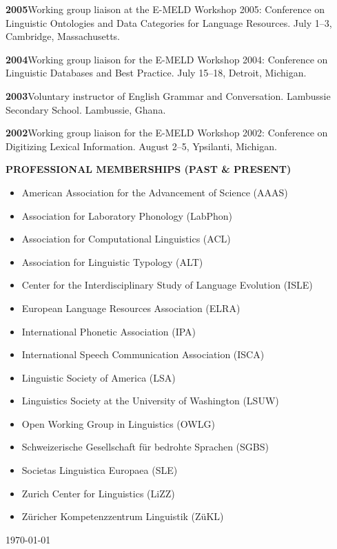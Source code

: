 \documentclass[11pt]{article}
\newcommand{\hangpara}{
 \setlength{\parindent}{0in} %
 \hangindent=0.42in %
}
\begin{document}
\vskip 6pt
\hangpara
{\bf 2005}\hspace{1ex}Working group liaison at the E-MELD Workshop 2005: Conference on Linguistic Ontologies and Data Categories for Language Resources. July 1--3, Cambridge, Massachusetts.

\vskip 6pt
\hangpara
{\bf 2004}\hspace{1ex}Working group liaison for the E-MELD Workshop 2004: Conference on Linguistic Databases and Best Practice. July 15--18, Detroit, Michigan.

\vskip 6pt
\hangpara
{\bf 2003}\hspace{1ex}Voluntary instructor of English Grammar and Conversation. Lambussie Secondary School. Lambussie, Ghana.

\vskip 6pt
\hangpara
{\bf 2002}\hspace{1ex}Working group liaison for the E-MELD Workshop 2002: Conference on Digitizing Lexical Information. August 2--5, Ypsilanti, Michigan.


\clearpage
\vskip 20pt
\begin{flushleft}
{\bf PROFESSIONAL MEMBERSHIPS (PAST \& PRESENT)}
\end{flushleft}
\begin{itemize}
\item American Association for the Advancement of Science (AAAS)
\item Association for Laboratory Phonology (LabPhon)
\item Association for Computational Linguistics (ACL)
\item Association for Linguistic Typology (ALT)
\item Center for the Interdisciplinary Study of Language Evolution (ISLE)
\item European Language Resources Association (ELRA)
\item International Phonetic Association (IPA)
\item International Speech Communication Association (ISCA)
\item Linguistic Society of America (LSA)
\item Linguistics Society at the University of Washington (LSUW)
\item Open Working Group in Linguistics (OWLG)
\item Schweizerische Gesellschaft f{\"u}r bedrohte Sprachen (SGBS)
\item Societas Linguistica Europaea (SLE)
\item Zurich Center for Linguistics (LiZZ)
\item Z{\"u}richer Kompetenzzentrum Linguistik (Z{\"u}KL)
\end{itemize}

\vskip 20pt
\today
\end{document}
